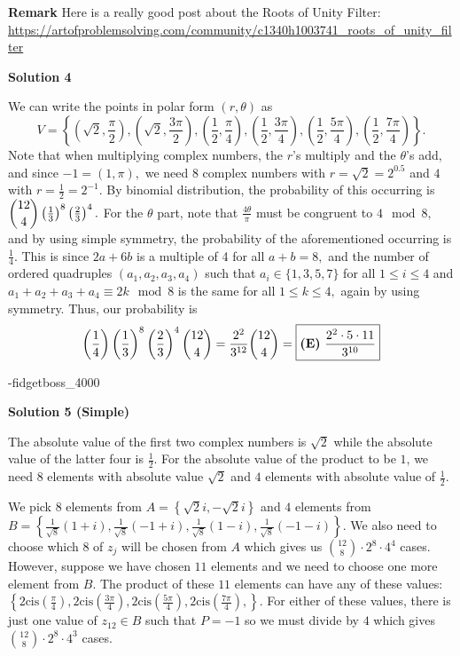 \begin{enumerate}
 \textbf{Remark} Here is a really good post about the Roots of Unity Filter: \href{https://artofproblemsolving.com/community/c1340h1003741\_roots\_of\_unity\_filter}{https://artofproblemsolving.com/community/c1340h1003741\_roots\_of\_unity\_filter}

 



\textbf{Solution 4}

We can write the points in polar form $(r, \theta)$ as
 \[V = \left\{ \left(\sqrt{2}, \frac{\pi}{2}\right), \left(\sqrt{2}, \frac{3\pi}{2}\right), \left(\frac{1}{2}, \frac{\pi}{4}\right), \left(\frac{1}{2}, \frac{3\pi}{4}\right), \left(\frac{1}{2}, \frac{5\pi}{4}\right), \left(\frac{1}{2}, \frac{7\pi}{4}\right)\right\}.\]Note that when multiplying complex numbers, the $r$'s multiply and the $\theta$'s add, and since $-1 = (1, \pi),$ we need $8$ complex numbers with $r = \sqrt{2} = 2^{0.5}$ and $4$ with $r = \frac{1}{2} = 2^{-1}.$ By binomial distribution, the probability of this occurring is $\dbinom{12}{4} \left(\frac{1}{3}\right)^8 \left(\frac{2}{3}\right)^4.$ For the $\theta$ part, note that $\frac{4\theta}{\pi}$ must be congruent to $4 \mod 8,$ and by using simple symmetry, the probability of the aforementioned occurring is $\frac{1}{4}.$ This is since $2a + 6b$ is a multiple of 4 for all $a + b =8,$ and the number of ordered quadruples $(a_1, a_2, a_3, a_4)$ such that $a_i \in \{1, 3, 5, 7\}$ for all $1 \leq i \leq 4$ and $a_1 + a_2 + a_3 + a_4 \equiv 2k \mod 8$ is the same for all $1 \leq k \leq 4,$ again by using symmetry. Thus, our probability is 
 \[\left(\frac{1}{4}\right) \left(\frac{1}{3}\right)^8 \left(\frac{2}{3}\right)^4 \dbinom{12}{4} = \frac{2^2}{3^{12}} \dbinom{12}{4} = \boxed{\textbf{(E)} ~\frac{2^2\cdot 5\cdot 11}{3^{10}}}\]

 -fidgetboss\_4000

 



\textbf{Solution 5 (Simple)}

The absolute value of the first two complex numbers is $\sqrt{2}$ while the absolute value of the latter four is $\frac12$. For the absolute value of the product to be $1$, we need $8$ elements with absolute value $\sqrt{2}$ and $4$ elements with absolute value of $\frac12$.

 We pick $8$ elements from $A = \left\{   \sqrt{2}i,-\sqrt{2}i\right\}$ and $4$ elements from $B = \left\{\frac{1}{\sqrt{8}}(1+i),\frac{1}{\sqrt{8}}(-1+i),\frac{1}{\sqrt{8}}(1-i),\frac{1}{\sqrt{8}}(-1-i) \right\}$. We also need to choose which $8$ of $z_j$ will be chosen from $A$ which gives us ${12 \choose 8} \cdot 2^8 \cdot 4^4$ cases. However, suppose we have chosen $11$ elements and we need to choose one more element from $B$. The product of these $11$ elements can have any of these values: $\left\{ 2\mathrm{cis}(\frac{\pi}{4}), 2\mathrm{cis}(\frac{3\pi}{4}), 2\mathrm{cis}(\frac{5\pi}{4}), 2\mathrm{cis}(\frac{7\pi}{4}), \right\}$. For either of these values, there is just one value of $z_{12} \in B$ such that $P = -1$ so we must divide by $4$ which gives ${12 \choose 8} \cdot 2^8 \cdot 4^3$ cases. 


\end{enumerate}
